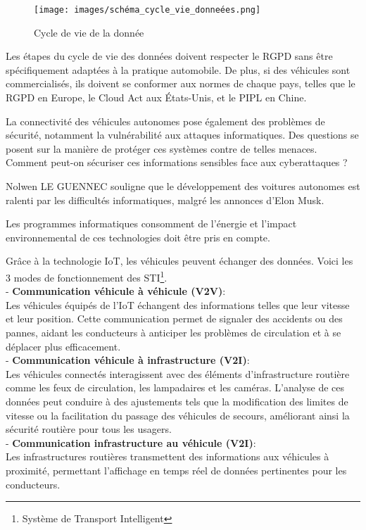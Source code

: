 \documentclass{article}
\begin{document}
\begin{figure}[h]
    \centering
    \texttt{[image: images/schéma\_cycle\_vie\_donneées.png]} 
    \caption{Cycle de vie de la donnée}
\end{figure}

Les étapes du cycle de vie des données doivent respecter le RGPD sans être spécifiquement adaptées à la pratique automobile. De plus, si des véhicules sont commercialisés, ils doivent se conformer aux normes de chaque pays, telles que le RGPD en Europe, le Cloud Act aux États-Unis, et le PIPL en Chine.

La connectivité des véhicules autonomes pose également des problèmes de sécurité, notamment la vulnérabilité aux attaques informatiques. Des questions se posent sur la manière de protéger ces systèmes contre de telles menaces. Comment peut-on sécuriser ces informations sensibles face aux cyberattaques ?

Nolwen LE GUENNEC\cite{le_gennec_machine_2023} souligne que le développement des voitures autonomes est ralenti par les difficultés informatiques, malgré les annonces d’Elon Musk. 


Les programmes informatiques consomment de l’énergie et l'impact environnemental de ces technologies doit être pris en compte.

Grâce à la technologie IoT, les véhicules peuvent échanger des données. Voici les 3 modes de fonctionnement des STI\footnote{Système de Transport Intelligent}.\\
- \textbf{Communication véhicule à véhicule (V2V)}:\\
Les véhicules équipés de l’IoT échangent des informations telles que leur vitesse et leur position. Cette communication permet de signaler des accidents ou des pannes, aidant les conducteurs à anticiper les problèmes de circulation et à se déplacer plus efficacement.\\
- \textbf{Communication véhicule à infrastructure (V2I)}:\\
Les véhicules connectés interagissent avec des éléments d’infrastructure routière comme les feux de circulation, les lampadaires et les caméras. 
L’analyse de ces données peut conduire à des ajustements tels que la modification des limites de vitesse ou la facilitation du passage des véhicules de secours, améliorant ainsi la sécurité routière pour tous les usagers.\\
- \textbf{Communication infrastructure au véhicule (V2I)}:\\
Les infrastructures routières transmettent des informations aux véhicules à proximité, permettant l’affichage en temps réel de données pertinentes pour les conducteurs.
\end{document}
